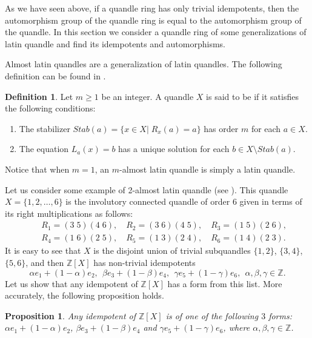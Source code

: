 \documentclass[12pt]{amsart}
\newtheorem{pro}[thm]{Proposition}
\theoremstyle{definition}
\newtheorem{definition}[thm]{Definition}
\theoremstyle{remark}
\newcommand{\Z}{\mathbb{Z}}
\begin{document}
As we have seen above, if a quandle ring has only trivial idempotents, then the automorphism group of the quandle ring is equal to the automorphism group of the quandle.  In this section we consider a quandle ring of some generalizations of latin quandle  and find its idempotents and automorphisms.

Almost latin quandles are a generalization of latin quandles.  The following definition can be found in \cite{PY}.
  \begin{definition} 
Let $m\geq 1$ be an integer.  A quandle $X$ is said to be  if it satisfies the following conditions:
\begin{enumerate}
\item The stabilizer $Stab(a) =\{ x \in X | \; R_x(a)=a \}$ has order $m$  for each $a \in X$.
\item The equation $L_a(x)=b$ has a unique solution for each $b \in X \setminus Stab(a)$.
	\end{enumerate}
\end{definition}
Notice that when $m=1$, an $m$-almost latin quandle is simply a latin quandle.

Let us consider some example of 2-almost latin quandle (see \cite[Example 13.17]{BES}).
This quandle  $X= \{1, 2, \ldots, 6 \}$ is the involutory  connected quandle of order 6 given in terms of its right multiplications as follows:
\begin{eqnarray*}
&& R_1=(3\;5)(4\;6), \quad R_2=(3\;6)(4\;5), \quad R_3=(1\;5)(2\;6),\\
&& R_4=(1\;6)(2\;5), \quad R_5=(1\;3)(2\;4), \quad R_6=(1\;4)(2\;3).
\end{eqnarray*}
It is easy to see that $X$ is the disjoint union of trivial subquandles $\{ 1, 2 \}$, $\{ 3, 4 \}$, $\{ 5, 6 \}$, and then $\Z[X]$ has  non-trivial idempotents
$$
\alpha e_1 + (1 - \alpha) e_2,~~\beta e_3 + (1 - \beta) e_4,~~\gamma e_5 + (1 - \gamma) e_6,~~ \alpha, \beta, \gamma \in \Z.
$$ 
Let us show that any idempotent of  $\Z[X]$ has a form from this list. More accurately, the following proposition holds.



\begin{pro} \label{IdX}
Any idempotent of  $\Z[X]$  is of one of the following $3$ forms:  $\alpha e_1 +(1-\alpha)e_2$, $\beta e_3+(1-\beta)e_4$ and $\gamma e_5 +(1-\gamma)e_6$, where $\alpha, \beta, \gamma \in \mathbb{Z}$.
\end{pro} 
\end{document}
